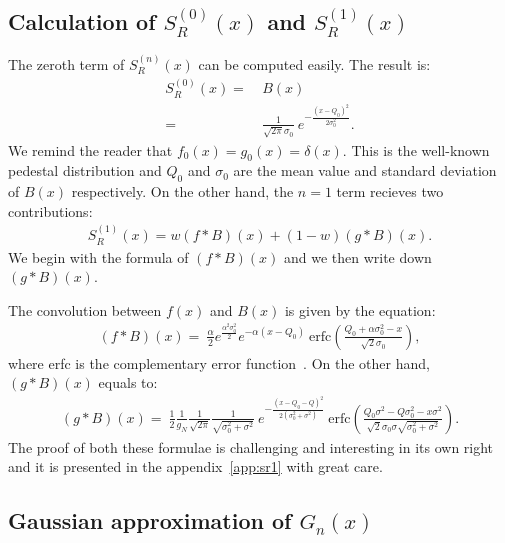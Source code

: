 \documentclass[a4paper,11pt]{article}
\begin{document}
\subsection{Calculation of $S^{(0)}_R(x)$ and $S^{(1)}_R(x)$}
%

The zeroth term of $S^{(n)}_R(x)$ can be computed easily. 
The result is:
\begin{align}
S^{(0)}_R(x)  = \ & B(x) \nonumber \\
                      = \ & \frac{1}{\sqrt{2\pi}\sigma_0} \ e^{-\frac{(x-Q_0)^2}{2\sigma_0^2}}.
\end{align}
We remind the reader that $f_0(x)=g_0(x)=\delta (x)$. 
This is the well-known pedestal distribution and $Q_0$ and $\sigma_0$ are the mean value and standard deviation of $B(x)$ respectively. 
On the other hand, the $n=1$ term recieves two contributions:
\begin{align}
S^{(1)}_R(x)  = w (f*B)(x) + (1-w)(g*B)(x). 
\end{align}                     
We begin with the formula of $(f*B)(x)$ and we then write down $(g*B)(x)$.

The convolution between $f(x)$ and $B(x)$ is given by the equation:
\begin{align}
(f*B)(x)  = \ \frac{\alpha}{2} e^{\frac{\alpha^2\sigma_0^2}{2}} e^{-\alpha (x-Q_0)} \ \text{erfc}\left( \frac{Q_0 + \alpha\sigma_0^2 - x }{\sqrt{2}\sigma_0} \right),
\end{align}  
where erfc is the complementary error function~\cite{erf}.
On the other hand, $(g*B)(x)$ equals to:
\begin{align}
(g*B)(x)  = \ \frac{1}{2} \frac{1}{g_N} \frac{1}{\sqrt{2\pi}} \frac{1}{\sqrt{\sigma_0^2 + \sigma^2}} \ e^{ -\frac{ (x-Q_0-Q)^2 }{2(\sigma_0^2 + \sigma^2)}} 
\ \text{erfc}\left(  \frac{ Q_0\sigma^2 -Q\sigma_0^2 -x \sigma^2  }{\sqrt{2} \sigma_0\sigma\sqrt{\sigma_0^2 + \sigma^2} }   \right).
\end{align}  
The proof of both these formulae is challenging and interesting in its own right and it is presented in the appendix~\ref{app:sr1} with great care. 

\subsection{Gaussian approximation of $G_n(x)$}
%
\end{document}
